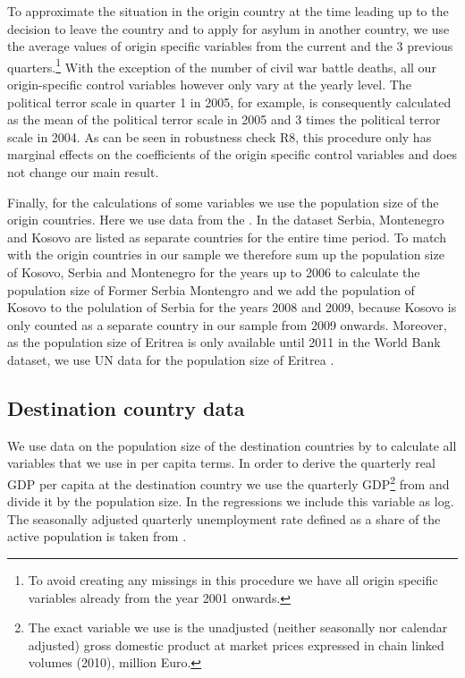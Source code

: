\documentclass[11pt,a4paper]{scrartcl}
\begin{document}
To approximate the situation in the origin country at the time leading up to the decision to leave the country and to apply for asylum in another country, we use the average values of origin specific variables from the current and the 3 previous quarters.\footnote{To avoid creating any missings in this procedure we have all origin specific variables already from the year 2001 onwards.} With the exception of the number of civil war battle deaths, all our origin-specific control variables however only vary at the yearly level. The political terror scale in quarter 1 in 2005, for example, is consequently calculated as the mean of the political terror scale in 2005 and 3 times the political terror scale in 2004. As can be seen in robustness check R8, this procedure only has marginal effects on the coefficients of the origin specific control variables and does not change our main result. 

Finally, for the calculations of some variables we use the population size of the origin countries. Here we use data from the \textcite{Worldbank2017b}. In the dataset Serbia, Montenegro and Kosovo are listed as separate countries for the entire time period. To match with the origin countries in our sample we therefore sum up the population size of Kosovo, Serbia and Montenegro for the years up to 2006 to calculate the population size of Former Serbia Montengro and we add the population of Kosovo to the polulation of Serbia for the years 2008 and 2009, because Kosovo is only counted as a separate country in our sample from 2009 onwards. Moreover, as the population size of Eritrea is only available until 2011 in the World Bank dataset, we use UN data for the population size of Eritrea \parencite{UN2017}.  

\subsection{Destination country data}
We use data on the population size of the destination countries by \textcite{Eurostat2017e} to calculate all variables that we use in per capita terms.    
In order to derive the quarterly real GDP per capita at the destination country we use the quarterly GDP\footnote{The exact variable we use is the unadjusted (neither seasonally nor calendar adjusted) gross domestic product at market prices expressed in chain linked volumes (2010), million Euro.} from \textcite{Eurostat2017f} and divide it by the population size. In the regressions we include this variable as log. 
The seasonally adjusted quarterly unemployment rate defined as a share of the active population is taken from \textcite{Eurostat2018d}. 
\end{document}
